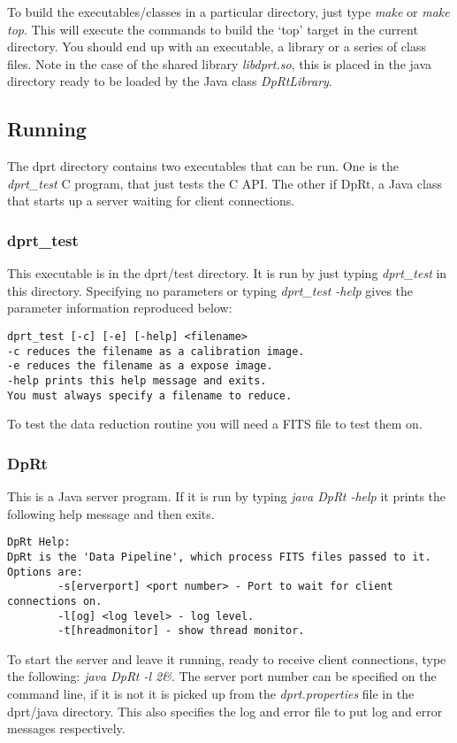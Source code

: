 \documentclass[10pt,a4paper]{article}
\begin{document}
To build the executables/classes in a particular directory, just type {\em make} or {\em make top}. 
This will execute the commands
to build the `top' target in the current directory. You should end up with an executable, a library or a series
of class files. Note in the case of the shared library {\em libdprt.so}, this is placed in the java directory
ready to be loaded by the Java class {\em DpRtLibrary}.

\subsection{Running}
The dprt directory contains two executables that can be run. One is the {\em dprt\_test} C program, that just
tests the C API. The other if DpRt, a Java class that starts up a server waiting for client connections.

\subsubsection{dprt\_test}
This executable is in the dprt/test directory. It is run by just typing {\em dprt\_test} in this directory.
Specifying no parameters or typing {\em dprt\_test -help} gives the parameter information reproduced below:
\begin{verbatim}
dprt_test [-c] [-e] [-help] <filename>
-c reduces the filename as a calibration image.
-e reduces the filename as a expose image.
-help prints this help message and exits.
You must always specify a filename to reduce.
\end{verbatim}
To test the data reduction routine you will need a FITS file to test them on.

\subsubsection{DpRt}
This is a Java server program. If it is run by typing {\em java DpRt -help} it prints the following help message
and then exits.
\begin{verbatim}
DpRt Help:
DpRt is the 'Data Pipeline', which process FITS files passed to it.
Options are:
        -s[erverport] <port number> - Port to wait for client connections on.
        -l[og] <log level> - log level.
        -t[hreadmonitor] - show thread monitor.
\end{verbatim}

To start the server and leave it running, ready to receive client connections, type the following:
{\em java DpRt -l 2\&}. The server port number can be specified on the command line, if it is not it is
picked up from the {\em dprt.properties} file in the dprt/java directory. This also specifies the log and
error file to put log and error messages respectively.
\end{document}
